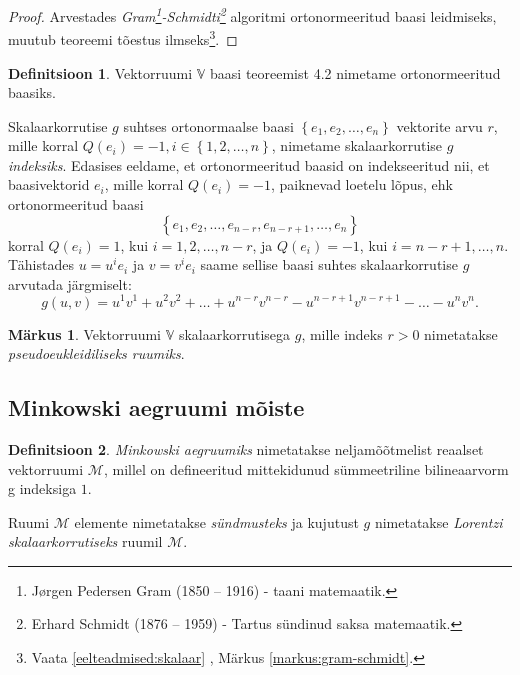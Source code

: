\documentclass[12pt,a4paper,oneside]{article}
\theoremstyle{plain}
\theoremstyle{definition}
\newtheorem{definitsioon}{Definitsioon}[section]
\newtheorem{markus}{Märkus}[section]
\numberwithin{equation}{section}
\def\V{{\mathbb V}}
\def\M{{\mathcal M}}
\begin{document}
\begin{proof}
Arvestades \textit{Gram\footnote{Jørgen Pedersen Gram (1850 – 1916) - 
taani matemaatik.}-Schmidti\footnote{Erhard Schmidt (1876 – 1959) - 
Tartus sündinud saksa matemaatik.}} algoritmi ortonormeeritud baasi 
leidmiseks, muutub teoreemi tõestus ilmseks\footnote{Vaata 
\ref{eelteadmised:skalaar} , 
Märkus \ref{markus:gram-schmidt}.}.
\end{proof}

\begin{definitsioon}
Vektorruumi $\V$ baasi teoreemist 4.2 nimetame ortonormeeritud 
baasiks.
\end{definitsioon}

Skalaarkorrutise $g$ suhtses ortonormaalse baasi 
$\left\lbrace e_1, e_2, \dots, e_n \right\rbrace$ vektorite arvu 
$r$, mille korral $Q \left(e_i\right) = -1, i \in 
\left\lbrace 1, 2, \dots, n \right\rbrace$, nimetame skalaarkorrutise 
$g$ \emph{indeksiks}.
Edasises eeldame, et ortonormeeritud baasid on indekseeritud nii, et 
baasivektorid $e_i$, mille korral $Q \left(e_i\right) = -1$, paiknevad 
loetelu lõpus, ehk ortonormeeritud baasi 
\[\left\lbrace e_1, e_2, \dots, e_{n-r}, e_{n-r+1}, 
\dots, e_n \right\rbrace\]
korral $Q \left(e_i\right) = 1$, kui $i = 1, 2, \dots, n-r$, ja 
$Q \left(e_i\right) = -1$, kui $i = n-r+1, \dots, n$. Tähistades 
$u = u^i e_i$ ja $v = v^i e_i$ saame sellise baasi suhtes 
skalaarkorrutise $g$ arvutada järgmiselt:
\[g\left(u, v\right) = u^1 v^1 + u^2 v^2 + \ldots + u^{n-r} v^{n-r} - 
u^{n-r+1} v^{n-r+1} - \ldots - u^n v^n.\]

\begin{markus}
Vektorruumi $\V$ skalaarkorrutisega $g$, mille indeks 
$r > 0$ nimetatakse \emph{pseudoeukleidiliseks ruumiks}.
\end{markus}


\subsection{Minkowski aegruumi mõiste}

\begin{definitsioon}
\emph{Minkowski aegruumiks} nimetatakse neljamõõtmelist reaalset 
vektorruumi $\M$, millel on defineeritud mittekidunud sümmeetriline 
bilineaarvorm g indeksiga $1$.

Ruumi $\M$ elemente nimetatakse \emph{sündmusteks} ja kujutust $g$ 
nimetatakse \emph{Lorentzi skalaarkorrutiseks} ruumil $\M$.
\end{definitsioon}
\end{document}
